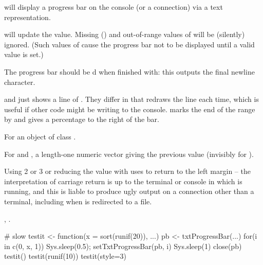 \begin{Details}\relax
{} will display a progress bar on the \R{} console
(or a connection) via a text representation.

 will update the value.  Missing
() and out-of-range values of  will be
(silently) ignored.  (Such values of  cause the progress
bar not to be displayed until a valid value is set.)

The progress bar should be d when finished with: this
outputs the final newline character.

 and  just shows a line of
. They differ in that  redraws the line
each time, which is useful if other code might be writing to the \R{}
console.   marks the end of the range by \code{|} and
gives a percentage to the right of the bar.
\end{Details}
%
\begin{Value}
For  an object of class .

For  and , a
length-one numeric vector giving the previous value (invisibly for
).
\end{Value}
%
\begin{Note}\relax
Using  2 or 3 or reducing the value with 
uses  to return to the left margin -- the interpretation of
carriage return is up to the terminal or console in which \R{} is
running, and this is liable to produce ugly output on a connection
other than a terminal, including when  is
redirected to a file.
\end{Note}
%
\begin{SeeAlso}\relax
{},
.
\end{SeeAlso}
%
\begin{Examples}
\begin{ExampleCode}
 # slow
testit <- function(x = sort(runif(20)), ...)
{
    pb <- txtProgressBar(...)
    for(i in c(0, x, 1)) {Sys.sleep(0.5); setTxtProgressBar(pb, i)}
    Sys.sleep(1)
    close(pb)
}
testit()
testit(runif(10))
testit(style=3)
\end{ExampleCode}
\end{Examples}
